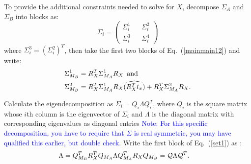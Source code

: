 \documentclass[twocolumn,10pt]{asme2ej}
\begin{document}
To provide the additional constraints needed to solve for $X$, decompose $\Sigma_{A}$ and $\Sigma_{B}$ into blocks as:
$$ \Sigma_{i}= \left(\begin{array}{ccc}
\Sigma_{i}^1 && \Sigma_{i}^2 \\
\Sigma_{i}^3 && \Sigma_{i}^4  \end{array}\right)
$$
where $\Sigma_{i}^3 = (\Sigma_{i}^2)^T$, then take the first two blocks of Eq.~(\ref{mainmain12}) and write:
\begin{equation}
\begin{split}
&\Sigma_{M_B}^1 =  R^T_X \Sigma_{M_A}^1 R_X {\rm \,\,\, and \,\,\,} \\
&\Sigma_{M_B}^2 =  R^T_X \Sigma_{M_A}^1 R_X(\widehat{R^T_X t_x}) + R^T_X \Sigma_{M_A}^2 R_X \label{set1}.
\end{split}
\end{equation}

Calculate the eigendecomposition as $ \Sigma_{i}=Q_i \Lambda Q_i^T$, where $Q_i$ is the square matrix whose $i$th column is the eigenvector of $\Sigma_i$ and $\Lambda$ is the diagonal matrix with corresponding eigenvalues as diagonal entries \textcolor{blue}{Note: For this specific decomposition, you have to require that $\Sigma$ is real symmetric, you may have qualified this earlier, but double check}. Write the first block of Eq.~(\ref{set1}) as \cite{ackermanGSI, ackermanIROS2013}:
\begin{align}
\Lambda &= Q_{M_B}^T R_X^T Q_{M_A} \Lambda Q_{M_A}^T R_X Q_{M_B} = {\cal Q} \Lambda {\cal Q}^T.
\label{QAQ}
\end{align}

\end{document}
